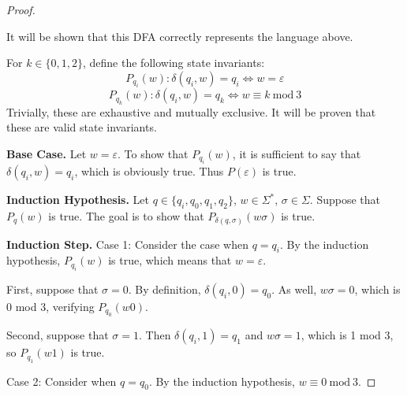 \documentclass[11pt]{article}
\begin{document}
\begin{enumerate}[label=\textbf{Q\arabic*.}]
\begin{enumerate}[label=\textit{\alph*)}]
\begin{proof}
		\begin{center}
		\end{center}

		It will be shown that this DFA correctly represents the language above.

		For \(k \in \{0, 1, 2\}\), define the following state invariants:
		\[
			P_{q_i}(w) : \delta (q_i, w) = q_i \iff w = \varepsilon
		\]
		\[
			P_{q_k}(w) : \delta (q_i, w) = q_k \iff w \equiv k \ \mathrm{mod}\ 3
		\]
		Trivially, these are exhaustive and mutually exclusive. It will be proven that these are valid state invariants.

		\textbf{Base Case.} Let \(w = \varepsilon\). To show that \(P_{q_i}(w)\), it is sufficient to say that \(\delta (q_i, w) = q_i\), which is obviously true. Thus \(P(\varepsilon)\) is true.

		\medskip

		\textbf{Induction Hypothesis.} Let \(q \in \{q_i , q_0, q_1, q_2\}\), \(w \in \Sigma ^*\), \(\sigma \in \Sigma\). Suppose that \(P_q(w)\) is true. The goal is to show that \(P_{\delta (q,\sigma)}(w \sigma)\) is true.

		\medskip

		\textbf{Induction Step.} Case 1: Consider the case when \(q = q_i\). By the induction hypothesis, \(P_{q_i}(w)\) is true, which means that \(w = \varepsilon\).

		First, suppose that \(\sigma = 0\). By definition, \(\delta (q_i,0) = q_0\). As well, \(w \sigma = 0\), which is 0 mod 3, verifying \(P_{q_0}(w0)\).

		Second, suppose that \(\sigma = 1\). Then \(\delta (q_i, 1) = q_1\) and \(w \sigma = 1\), which is 1 mod 3, so \(P_{q_1}(w1)\) is true.

		Case 2: Consider when \(q = q_0\). By the induction hypothesis, \(w \equiv 0 \ \mathrm{mod} \ 3\).


\end{proof}
\end{enumerate}
\end{enumerate}
\end{document}
